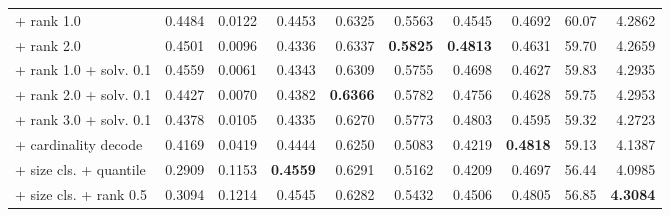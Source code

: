 \begin{table}[t]
\begin{tabular}{lrrrrrrrrr}
  + rank 1.0 & 0.4484 & 0.0122 & 0.4453 & 0.6325 & 0.5563 & 0.4545 & 0.4692 & 60.07 & 4.2862 \\
  + rank 2.0 & 0.4501 & 0.0096 & 0.4336 & 0.6337 & \textbf{0.5825} & \textbf{0.4813} & 0.4631 & 59.70 & 4.2659 \\
  + rank 1.0 + solv. 0.1 & 0.4559 & 0.0061 & 0.4343 & 0.6309 & 0.5755 & 0.4698 & 0.4627 & 59.83 & 4.2935 \\
  + rank 2.0 + solv. 0.1 & 0.4427 & 0.0070 & 0.4382 & \textbf{0.6366} & 0.5782 & 0.4756 & 0.4628 & 59.75 & 4.2953 \\
  + rank 3.0 + solv. 0.1 & 0.4378 & 0.0105 & 0.4335 & 0.6270 & 0.5773 & 0.4803 & 0.4595 & 59.32 & 4.2723 \\
  + cardinality decode & 0.4169 & 0.0419 & 0.4444 & 0.6250 & 0.5083 & 0.4219 & \textbf{0.4818} & 59.13 & 4.1387 \\
  + size cls. + quantile & 0.2909 & 0.1153 & \textbf{0.4559} & 0.6291 & 0.5162 & 0.4209 & 0.4697 & 56.44 & 4.0985 \\
  + size cls. + rank 0.5 & 0.3094 & 0.1214 & 0.4545 & 0.6282 & 0.5432 & 0.4506 & 0.4805 & 56.85 & \textbf{4.3084} \\
\bottomrule
\end{tabular}
\vspace{2pt}{\footnotesize 单次训练。Val.\ score 为验证集调优后的选模分，只在同一套选模权重内可比。配置选择一律依据验证集，测试集不参与任何选择。}
\end{table}
